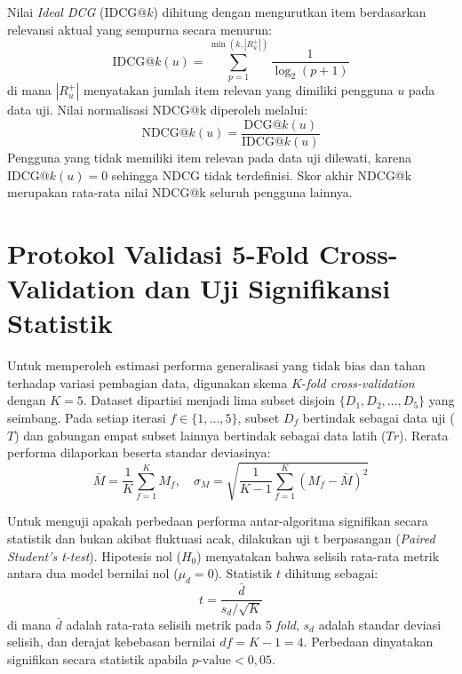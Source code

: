 Nilai \textit{Ideal DCG} ($\text{IDCG}@k$) dihitung dengan mengurutkan item berdasarkan relevansi aktual yang sempurna secara menurun:
\begin{equation}
\label{eq:idcg}
\text{IDCG}@k(u) = \sum_{p=1}^{\min(k, |R_u^+|)} \frac{1}{\log_2(p + 1)}
\end{equation}
di mana $|R_u^+|$ menyatakan jumlah item relevan yang dimiliki pengguna $u$ pada data uji. Nilai normalisasi NDCG@k diperoleh melalui:
\begin{equation}
\label{eq:ndcg}
\text{NDCG}@k(u) = \frac{\text{DCG}@k(u)}{\text{IDCG}@k(u)}
\end{equation}
Pengguna yang tidak memiliki item relevan pada data uji dilewati, karena $\text{IDCG}@k(u) = 0$ sehingga NDCG tidak terdefinisi. Skor akhir NDCG@k merupakan rata-rata nilai NDCG@k seluruh pengguna lainnya.

\section{Protokol Validasi 5-Fold Cross-Validation dan Uji Signifikansi Statistik}
Untuk memperoleh estimasi performa generalisasi yang tidak bias dan tahan terhadap variasi pembagian data, digunakan skema $K$-\textit{fold cross-validation} dengan $K=5$. Dataset dipartisi menjadi lima subset disjoin $\{D_1, D_2, \dots, D_5\}$ yang seimbang. Pada setiap iterasi $f \in \{1, \dots, 5\}$, subset $D_f$ bertindak sebagai data uji ($T$) dan gabungan empat subset lainnya bertindak sebagai data latih ($Tr$). Rerata performa dilaporkan beserta standar deviasinya:
\begin{equation}
\label{eq:mean_sd}
\bar{M} = \frac{1}{K}\sum_{f=1}^K M_f, \quad \sigma_M = \sqrt{\frac{1}{K-1}\sum_{f=1}^K (M_f - \bar{M})^2}
\end{equation}

Untuk menguji apakah perbedaan performa antar-algoritma signifikan secara statistik dan bukan akibat fluktuasi acak, dilakukan uji t berpasangan (\textit{Paired Student's t-test}). Hipotesis nol ($H_0$) menyatakan bahwa selisih rata-rata metrik antara dua model bernilai nol ($\mu_d = 0$). Statistik $t$ dihitung sebagai:
\begin{equation}
\label{eq:paired_t}
t = \frac{\bar{d}}{s_d / \sqrt{K}}
\end{equation}
di mana $\bar{d}$ adalah rata-rata selisih metrik pada 5 \textit{fold}, $s_d$ adalah standar deviasi selisih, dan derajat kebebasan bernilai $df = K - 1 = 4$. Perbedaan dinyatakan signifikan secara statistik apabila $p\text{-value} < 0,05$.

